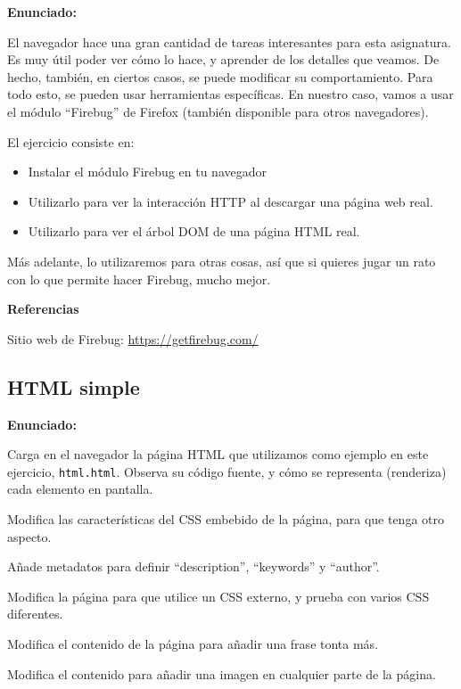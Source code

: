 \textbf{Enunciado:}

El navegador hace una gran cantidad de tareas interesantes para esta asignatura. Es muy útil poder ver cómo lo hace, y aprender de los detalles que veamos. De hecho, también, en ciertos casos, se puede modificar su comportamiento. Para todo esto, se pueden usar herramientas específicas. En nuestro caso, vamos a usar el módulo ``Firebug'' de Firefox (también disponible para otros navegadores).

El ejercicio consiste en:

\begin{itemize}
\item Instalar el módulo Firebug en tu navegador
\item Utilizarlo para ver la interacción HTTP al descargar una página web real.
\item Utilizarlo para ver el árbol DOM de una página HTML real.
\end{itemize}

Más adelante, lo utilizaremos para otras cosas, así que si quieres jugar un rato con lo que permite hacer Firebug, mucho mejor.

\textbf{Referencias}

Sitio web de Firebug: \url{https://getfirebug.com/}


\subsection{HTML simple}
\label{subsec:eje-html-simple}

\textbf{Enunciado:}

Carga en el navegador la página HTML que utilizamos como ejemplo en este ejercicio, \verb|html.html|. Observa su código fuente, y cómo se representa (renderiza) cada elemento en pantalla.

Modifica las características del CSS embebido de la página, para que tenga otro aspecto.

Añade metadatos para definir ``description'', ``keywords'' y ``author''.

Modifica la página para que utilice un CSS externo, y prueba con varios CSS diferentes.

Modifica el contenido de la página para añadir una frase tonta más.

Modifica el contenido para añadir una imagen en cualquier parte de la página.

